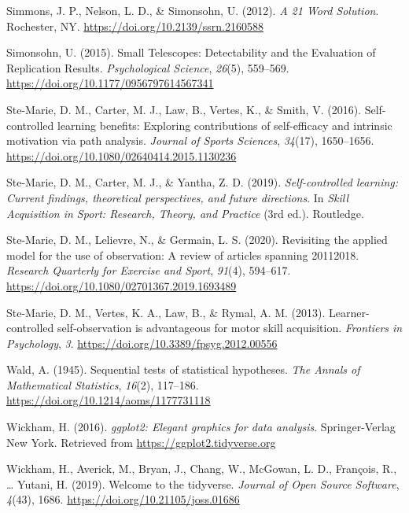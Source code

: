 \documentclass[
  english,
  doc, donotrepeattitle,floatsintext]{apa7}
\newlength{\cslhangindent}
\newlength{\cslentryspacingunit} %
\newenvironment{CSLReferences}[2] %
 {%
  \setlength{\parindent}{0pt}
  \ifodd #1
  \let\oldpar\par
  \def\par{\hangindent=\cslhangindent\oldpar}
  \fi
  \setlength{\parskip}{#2\cslentryspacingunit}
 }%
 {}
\begin{document}
\begin{CSLReferences}{1}{0}
\leavevmode{}%
Simmons, J. P., Nelson, L. D., \& Simonsohn, U. (2012). \emph{A 21 Word Solution}. Rochester, NY. \url{https://doi.org/10.2139/ssrn.2160588}

\leavevmode{}%
Simonsohn, U. (2015). Small Telescopes: Detectability and the Evaluation of Replication Results. \emph{Psychological Science}, \emph{26}(5), 559--569. \url{https://doi.org/10.1177/0956797614567341}

\leavevmode{}%
Ste-Marie, D. M., Carter, M. J., Law, B., Vertes, K., \& Smith, V. (2016). Self-controlled learning benefits: Exploring contributions of self-efficacy and intrinsic motivation via path analysis. \emph{Journal of Sports Sciences}, \emph{34}(17), 1650--1656. \url{https://doi.org/10.1080/02640414.2015.1130236}

\leavevmode{}%
Ste-Marie, D. M., Carter, M. J., \& Yantha, Z. D. (2019). \emph{Self-controlled learning: Current findings, theoretical perspectives, and future directions}. In \emph{Skill Acquisition in Sport: Research, Theory, and Practice} (3rd ed.). Routledge.

\leavevmode{}%
Ste-Marie, D. M., Lelievre, N., \& Germain, L. S. (2020). Revisiting the applied model for the use of observation: A review of articles spanning 2011{\textendash}2018. \emph{Research Quarterly for Exercise and Sport}, \emph{91}(4), 594--617. \url{https://doi.org/10.1080/02701367.2019.1693489}

\leavevmode{}%
Ste-Marie, D. M., Vertes, K. A., Law, B., \& Rymal, A. M. (2013). Learner-controlled self-observation is advantageous for motor skill acquisition. \emph{Frontiers in Psychology}, \emph{3}. \url{https://doi.org/10.3389/fpsyg.2012.00556}

\leavevmode{}%
Wald, A. (1945). Sequential tests of statistical hypotheses. \emph{The Annals of Mathematical Statistics}, \emph{16}(2), 117--186. \url{https://doi.org/10.1214/aoms/1177731118}

\leavevmode{}%
Wickham, H. (2016). \emph{ggplot2: Elegant graphics for data analysis}. Springer-Verlag New York. Retrieved from \url{https://ggplot2.tidyverse.org}

\leavevmode{}%
Wickham, H., Averick, M., Bryan, J., Chang, W., McGowan, L. D., François, R., \ldots{} Yutani, H. (2019). Welcome to the {tidyverse}. \emph{Journal of Open Source Software}, \emph{4}(43), 1686. \url{https://doi.org/10.21105/joss.01686}


\end{CSLReferences}
\end{document}
